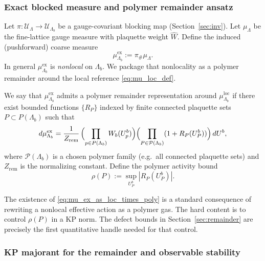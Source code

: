 \subsubsection{Exact blocked measure and polymer remainder ansatz}

Let $\pi:\mathcal U_\Lambda\to\mathcal U_{\Lambda_b}$ be a gauge-covariant blocking map (Section~\ref{sec:inv}).
Let $\mu_\Lambda$ be the fine-lattice gauge measure with plaquette weight $\widehat W$.
Define the induced (pushforward) coarse measure
\begin{equation}
\mu^{\mathrm{ex}}_{\Lambda_b}:=\pi_{\#}\mu_\Lambda.
\end{equation}
In general $\mu^{\mathrm{ex}}_{\Lambda_b}$ is \emph{nonlocal} on $\Lambda_b$.
We package that nonlocality as a polymer remainder around the local reference \eqref{eq:mu_loc_def}.

\begin{definition}\label{def:poly_remainder}
We say that $\mu^{\mathrm{ex}}_{\Lambda_b}$ admits a polymer remainder representation around $\mu^{\mathrm{loc}}_{\Lambda_b}$ if there exist bounded functions $\{R_P\}$ indexed by finite connected plaquette sets $P\subset P(\Lambda_b)$ such that
\begin{equation}\label{eq:mu_ex_as_loc_times_poly}
d\mu^{\mathrm{ex}}_{\Lambda_b}
=
\frac{1}{Z_{\mathrm{rem}}}\,
\Bigl(\prod_{p\in P(\Lambda_b)} W_b(U^b_p)\Bigr)
\Bigl(\prod_{P\in\mathcal P(\Lambda_b)}(1+R_P(U^b_P))\Bigr)
\,dU^b,
\end{equation}
where $\mathcal P(\Lambda_b)$ is a chosen polymer family (e.g.\ all connected plaquette sets) and $Z_{\mathrm{rem}}$ is the normalizing constant.
Define the polymer activity bound
\begin{equation}\label{eq:rho_def}
\rho(P):=\sup_{U^b_P}|R_P(U^b_P)|.
\end{equation}
\end{definition}

\begin{remark}
The existence of \eqref{eq:mu_ex_as_loc_times_poly} is a standard consequence of rewriting a nonlocal effective action as a polymer gas.
The hard content is to control $\rho(P)$ in a KP norm.
The defect bounds in Section~\ref{sec:remainder} are precisely the first quantitative handle needed for that control.
\end{remark}

\subsubsection{KP majorant for the remainder and observable stability}


